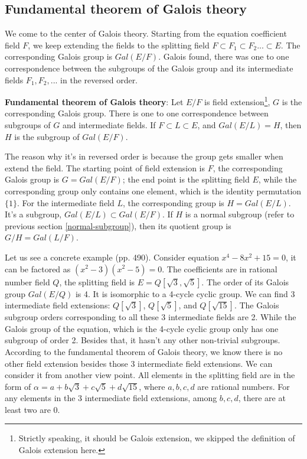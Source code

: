 \documentclass{article}
\begin{document}
\subsection{Fundamental theorem of Galois theory}

We come to the center of Galois theory. Starting from the equation coefficient field $F$, we keep extending the fields to the splitting field $F \subset F_1 \subset F_2 ... \subset E$. The corresponding Galois group is $Gal(E/F)$. Galois found, there was one to one correspondence between the subgroups of the Galois group and its intermediate fields $F_1, F_2, ...$ in the reversed order.

\begin{theorem}
\textbf{Fundamental theorem of Galois theory}: Let $E/F$ is field extension\footnote{Strictly speaking, it should be Galois extension, we skipped the definition of Galois extension here.}, $G$ is the corresponding Galois group. There is one to one correspondence between subgroups of $G$ and intermediate fields. If $F \subset L \subset E$, and $Gal(E/L) = H$, then $H$ is the subgroup of $Gal(E/F)$.
\end{theorem}

The reason why it's in reversed order is because the group gets smaller when extend the field. The starting point of field extension is $F$, the corresponding Galois group is $G = Gal(E/F)$; the end point is the splitting field $E$, while the corresponding group only contains one element, which is the identity permutation $\{1\}$. For the intermediate field $L$, the corresponding group is $H = Gal(E/L)$. It's a subgroup, $Gal(E/L) \subset Gal(E/F)$. If $H$ is a normal subgroup (refer to previous section \ref{normal-subgroup}), then its quotient group is $G/H = Gal(L/F)$.

Let us see a concrete example\cite{MArtin} (pp. 490). Consider equation $x^4 - 8x^2 + 15 = 0$, it can be factored as $(x^2 - 3)(x^2 - 5) = 0$. The coefficients are in rational number field $Q$, the splitting field is $E = Q[\sqrt{3}, \sqrt{5}]$. The order of its Galois group $Gal(E/Q)$ is 4. It is isomorphic to a 4-cycle cyclic group. We can find 3 intermediate field extensions: $Q[\sqrt{3}]$, $Q[\sqrt{5}]$, and $Q[\sqrt{15}]$. The Galois subgroup orders corresponding to all these 3 intermediate fields are 2. While the Galois group of the equation, which is the 4-cycle cyclic group only has one subgroup of order 2. Besides that, it hasn't any other non-trivial subgroups. According to the fundamental theorem of Galois theory, we know there is no other field extension besides those 3 intermediate field extensions. We can consider it from another view point. All elements in the splitting field are in the form of $\alpha = a + b\sqrt{3} + c\sqrt{5} + d\sqrt{15}$, where $a, b, c, d$ are rational numbers. For any elements in the 3 intermediate field extensions, among $b, c, d$, there are at least two are 0.
\end{document}
